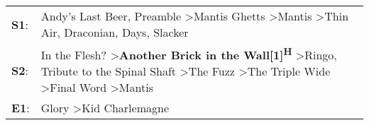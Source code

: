 \begin{supertabular}{p{0.03\textwidth}p{0.92\textwidth}}
 \textbf{S1}:  &                                                                                      Andy's Last Beer\textsuperscript{}, \enspace Preamble\textsuperscript{} \textgreater \enspace Mantis Ghetts\textsuperscript{} \textgreater \enspace Mantis\textsuperscript{} \textgreater \enspace Thin Air\textsuperscript{}, \enspace Draconian\textsuperscript{},  Days\textsuperscript{}, \enspace Slacker\textsuperscript{}  \enspace  \\
 \textbf{S2}:  &  In the Flesh?\textsuperscript{} \textgreater \enspace \textbf{Another Brick in the Wall[1]\textsuperscript{H}} \textgreater \enspace Ringo\textsuperscript{}, \enspace Tribute to the Spinal Shaft\textsuperscript{} \textgreater \enspace The Fuzz\textsuperscript{} \textgreater \enspace The Triple Wide\textsuperscript{} \textgreater \enspace Final Word\textsuperscript{} \textgreater \enspace Mantis\textsuperscript{}  \enspace  \\
 \textbf{E1}:  &                                                                                                                                                                                                                                                                                                                                                  Glory\textsuperscript{} \textgreater \enspace Kid Charlemagne\textsuperscript{}  \enspace  \\
\end{supertabular}

